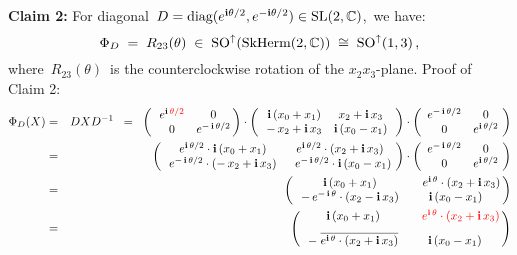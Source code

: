 \begin{enumerate}
	\vskip 0.3cm
	\noindent
	\textbf{Claim 2:}\quad
	For diagonal
	\,$D = \textnormal{diag}(e^{\textnormal{\bf i}\theta/2},e^{-\textnormal{\bf i}\theta/2}) \in \textnormal{SL}(2,\mathbb{C})$,\,
	we have:
	\begin{equation*}
	\Phi_{D}
	\; = \;
		R_{23}(\theta)
	\; \in \;
		\textnormal{SO}^{\uparrow}(\textnormal{SkHerm}(2,\mathbb{C}))
	\; \cong \;
		\textnormal{SO}^{\uparrow}(1,3)\,,
	\end{equation*}
	where
	\,$R_{23}(\theta)$\,
	is the counterclockwise rotation of the
	$x_{2}x_{3}$-plane.
	\vskip 0.1cm
	\noindent
	Proof of Claim 2:\;\;
	\begin{eqnarray*}
	\Phi_{D}(X)
	& = &
		DXD^{-1}
	\;\; = \;\;
		\left(\,\begin{array}{cc}
			e^{\i\,{\color{red}\theta/2}} & 0
			\\
			0 & e^{-\,\i\,\theta/2}
			\end{array}\!\!\right)
		\cdot
		\left(\,\begin{array}{cc}
			\i\,(x_{0}+x_{1}) & x_{2} + \i\,x_{3}
			\\
			- \, x_{2} + \i\,x_{3} & \i\,(x_{0}-x_{1})
			\end{array}\,\right)
		\cdot
		\left(\begin{array}{cc}
			e^{-\,\i\,\theta/2} & 0
			\\
			0 & e^{\i\,\theta/2}
			\end{array}\!\right)
	\\
	& = &
		\left(\,\begin{array}{cc}
			e^{\i\,\theta/2} \cdot \i\,(x_{0}+x_{1}) & e^{\i\,\theta/2} \cdot (x_{2} + \i\,x_{3})
			\\
			e^{-\,\i\,\theta/2} \cdot (-\,x_{2} + \i\,x_{3}) & \;\; e^{-\,\i\,\theta/2} \cdot \i\,(x_{0}-x_{1})
			\end{array}\!\right)
		\cdot
		\left(\begin{array}{cc}
			e^{-\,\i\,\theta/2} & 0
			\\
			0 & e^{\i\,\theta/2}
			\end{array}\!\right)
	\\
	& = &
		\left(\,\begin{array}{cc}
			\i\,(x_{0}+x_{1}) & \quad{\color{black}e^{\i\,\theta} \cdot (x_{2} + \i\,x_{3})}
			\\
			-\,e^{-\,\i\,\theta} \cdot (x_{2} - \i\,x_{3}) & \i\,(x_{0}-x_{1})
			\end{array}\!\!\right)
	\\
	& = &
		\left(\,\begin{array}{cc}
			\i\,(x_{0}+x_{1}) & \quad{\color{red}e^{\i\,\theta} \cdot (x_{2} + \i\,x_{3})}
			\\
			\overset{{\color{white}1}}{-\;\overline{e^{\i\,\theta} \cdot (x_{2} + \i\,x_{3})}} & \i\,(x_{0}-x_{1})
			\end{array}\!\!\right)
	\end{eqnarray*}


\end{enumerate}
